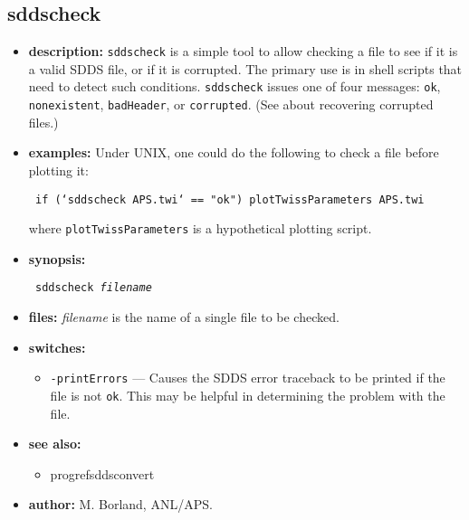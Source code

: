 \newpage
\subsection{sddscheck}
\label{sddscheck}

\begin{itemize}
\item {\bf description:} {\tt sddscheck} is a simple tool to allow checking a file to see if
it is a valid SDDS file, or if it is corrupted.  The primary use is in shell scripts that need
to detect such conditions.  {\tt sddscheck} issues one of four messages: {\tt ok}, {\tt
nonexistent}, {\tt badHeader}, or {\tt corrupted}.  (See  about recovering
corrupted files.)

\item {\bf examples:} 
Under UNIX, one could do the following to check a file before plotting it:
\begin{flushleft}{\tt
if (`sddscheck APS.twi` == "ok") plotTwissParameters APS.twi
}\end{flushleft}
where {\tt plotTwissParameters} is a hypothetical plotting script.
\item {\bf synopsis:} 
\begin{flushleft}{\tt
sddscheck {\em filename}
}\end{flushleft}
\item {\bf files:}
{\em filename} is the name of a single file to be checked.
\item {\bf switches:}
\begin{itemize}
\item {\tt -printErrors} --- Causes the SDDS error traceback to be printed if the file is not \verb|ok|.
        This may be helpful in determining the problem with the file.
\end{itemize}
\item {\bf see also:}
    \begin{itemize}
    \item progref{sddsconvert}
    \end{itemize}
\item {\bf author:} M. Borland, ANL/APS.
\end{itemize}


